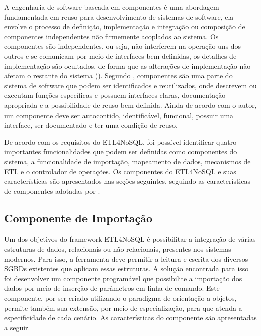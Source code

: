 A engenharia de software baseada em componentes é uma abordagem fundamentada em reuso para desenvolvimento de sistemas de software, ela envolve o processo de definição, implementação e integração ou composição de componentes independentes não firmemente acoplados ao sistema. Os componentes são independentes, ou seja, não interferem na operação uns dos outros e se comunicam por meio de interfaces bem definidas, os detalhes de implementação são ocultados, de forma que as alterações de implementação não afetam o restante do sistema (\cite{sommerville:2013}). Segundo \cite{sametinger:1997}, componentes são uma parte do sistema de software que podem ser identificados e reutilizados, onde descrevem ou executam funções específicas e possuem interfaces claras, documentação apropriada e a possibilidade de reuso bem definida. Ainda de acordo com o autor, um componente deve ser autocontido, identificável, funcional, possuir uma interface, ser documentado e ter uma condição de reuso. 

De acordo com os requisitos do ETL4NoSQL, foi possível identificar quatro importantes funcionalidades que podem ser definidas como componentes do sistema, a funcionalidade de importação, mapeamento de dados, mecanismos de ETL e o controlador de operações. Os componentes do ETL4NoSQL e suas características são apresentados nas seções seguintes, seguindo as características de componentes adotadas por \cite{heineman:2001}.


\subsection{Componente de Importação}

Um dos objetivos do framework ETL4NoSQL é possibilitar a integração de várias estruturas de dados, relacionais ou não relacionais, presentes nos sistemas modernos. Para isso, a ferramenta deve permitir a leitura e escrita dos diversos SGBDs existentes que aplicam essas estruturas. A solução encontrada para isso foi desenvolver um componente programável que possibilite a importação dos dados por meio de inserção de parâmetros em linha de comando. Este componente, por ser criado utilizando o paradigma de orientação a objetos, permite também sua extensão, por meio de especialização, para que atenda a especificidade de cada cenário. As características do componente são apresentadas a seguir.

